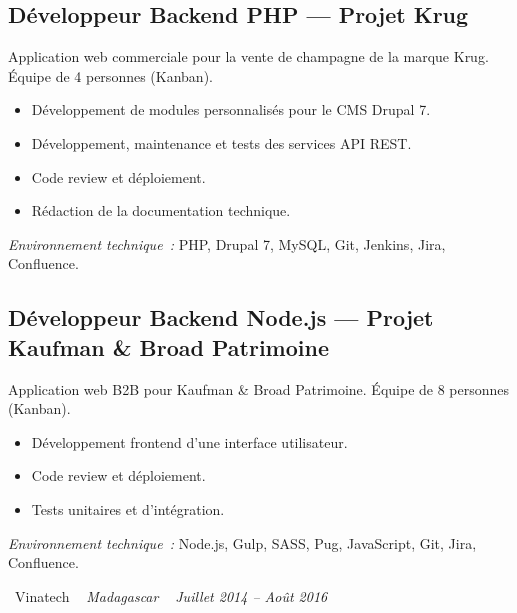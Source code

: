\documentclass[10pt,a4paper]{article}
\begin{document}
\subsection*{Développeur Backend PHP --- Projet Krug}
\color{darkgray}
Application web commerciale pour la vente de champagne de la marque Krug. Équipe de 4 personnes (Kanban).
\begin{itemize}
  \item Développement de modules personnalisés pour le CMS Drupal 7.
  \item Développement, maintenance et tests des services API REST.
  \item Code review et déploiement.
  \item Rédaction de la documentation technique.
\end{itemize}
\textit{Environnement technique~:} PHP, Drupal 7, MySQL, Git, Jenkins, Jira, Confluence.

\vspace{6pt}

\subsection*{Développeur Backend Node.js --- Projet Kaufman \& Broad Patrimoine}
\color{darkgray}
Application web B2B pour Kaufman \& Broad Patrimoine. Équipe de 8 personnes (Kanban).
\begin{itemize}
  \item Développement frontend d'une interface utilisateur.
  \item Code review et déploiement.
  \item Tests unitaires et d'intégration.
\end{itemize}
\textit{Environnement technique~:} Node.js, Gulp, SASS, Pug, JavaScript, Git, Jira, Confluence.

\vspace{10pt}

\noindent\textcolor{primary}{ \faBuilding\ Vinatech} \quad
\textit{ \small \textcolor{darkgray}{ \faMapMarker\ } Madagascar } \hfill
\textit{ \small \textcolor{darkgray}{ \faCalendar\ } Juillet 2014 -- Août 2016 }

\vspace{4pt}
\end{document}
